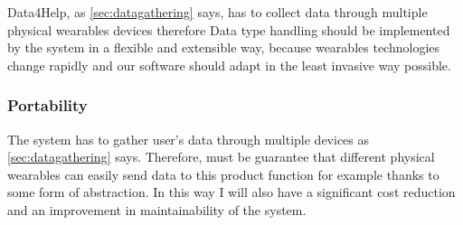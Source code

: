       Data4Help, as \ref{sec:datagathering} says, has to collect data through multiple physical wearables devices therefore Data type handling should be implemented by the system in a flexible and extensible way, because wearables technologies change rapidly and our software should adapt in the least invasive way possible.

    \subsubsection{Portability}

      The system has to gather user's data through multiple devices as \ref{sec:datagathering} says. Therefore, must be guarantee that different physical wearables can easily send data to this product function for example thanks to some form of abstraction. In this way I will also have a significant cost reduction and an improvement in maintainability of the system.
